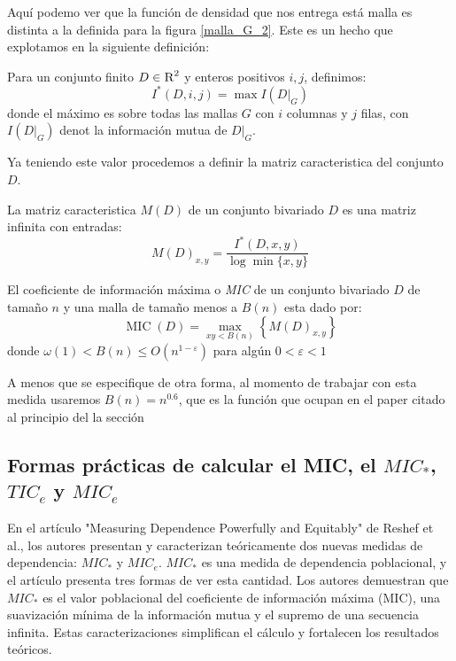 	Aqu\'i podemo ver que la funci\'on de densidad que nos entrega est\'a malla es distinta a la definida para la figura \ref{malla_G_2}. Este es un hecho que explotamos en la siguiente definici\'on: 

	\begin{defn}
		Para un conjunto finito $D\in\textsc{R}^2$ y enteros positivos $i,j$, definimos:
		$$
		I^*(D,i,j)=\max I(D|_G)
		$$
		donde el m\'aximo es sobre todas las mallas $G$ con $i$ columnas y $j$ filas, con $I(D|_G)$ denot la informaci\'on mutua de $D|_G$.
	\end{defn}

	Ya teniendo este valor procedemos a definir la matriz caracteristica del conjunto $D$.

	\begin{defn}
		La matriz caracteristica $M(D)$ de un conjunto bivariado $D$ es una matriz infinita con entradas:
		$$
		M(D)_{x, y}=\frac{I^{*}(D, x, y)}{\log \min \{x, y\}}
		$$
	\end{defn}
	\begin{defn}
		El coeficiente de informaci\'on m\'axima o \textit{MIC} de un conjunto bivariado $D$ de tama\~no $n$ y una malla de tama\~no menos a $B(n)$ esta dado por:
		$$
		\operatorname{MIC}(D)=\max _{x y<B(n)}\left\{M(D)_{x, y}\right\}
		$$
		donde $\omega(1)<B(n) \leq O\left(n^{1-\varepsilon}\right)$ para alg\'un $0<\varepsilon<1$ 
	\end{defn}
	\begin{rem}
		A menos que se especifique de otra forma, al momento de trabajar con esta medida usaremos $B(n)=n^{0.6}$, que es la funci\'on que ocupan en el paper citado al principio del la secci\'on
	\end{rem}

	\subsection{Formas pr\'acticas de calcular el MIC, el $MIC_*$, $TIC_e$ y $MIC_e$}

	En el art\'iculo "Measuring Dependence Powerfully and Equitably" de Reshef et al., los autores presentan y caracterizan te\'oricamente dos nuevas medidas de dependencia: $MIC_*$ y $MIC_e$. $MIC_*$ es una medida de dependencia poblacional, y el art\' iculo presenta tres formas de ver esta cantidad. Los autores demuestran que $MIC_*$ es el valor poblacional del coeficiente de informaci\'on m\'axima (MIC), una suavizaci\'on m\'inima de la informaci\'on mutua y el supremo de una secuencia infinita. Estas caracterizaciones simplifican el c\'alculo y fortalecen los resultados te\'oricos.

